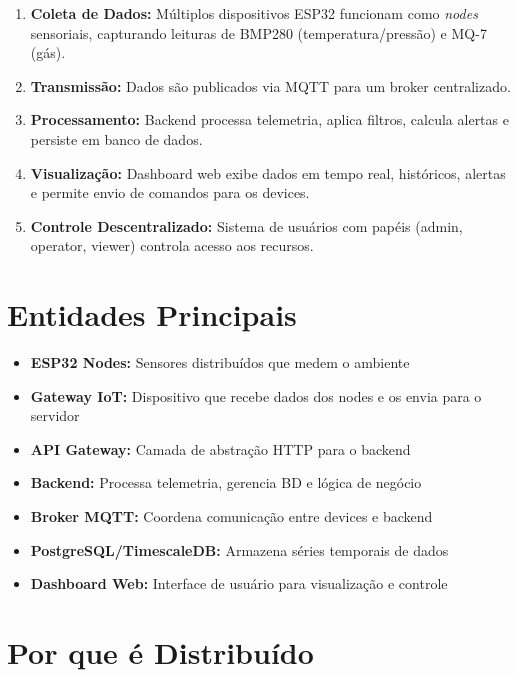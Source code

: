 \documentclass[12pt,a4paper,oneside]{report}
\begin{document}
\begin{enumerate}
    \item \textbf{Coleta de Dados:} Múltiplos dispositivos ESP32 funcionam como \textit{nodes} sensoriais, capturando leituras de BMP280 (temperatura/pressão) e MQ-7 (gás).
    
    \item \textbf{Transmissão:} Dados são publicados via MQTT para um broker centralizado.
    
    \item \textbf{Processamento:} Backend processa telemetria, aplica filtros, calcula alertas e persiste em banco de dados.
    
    \item \textbf{Visualização:} Dashboard web exibe dados em tempo real, históricos, alertas e permite envio de comandos para os devices.
    
    \item \textbf{Controle Descentralizado:} Sistema de usuários com papéis (admin, operator, viewer) controla acesso aos recursos.
\end{enumerate}

\section{Entidades Principais}

\begin{itemize}
    \item \textbf{ESP32 Nodes:} Sensores distribuídos que medem o ambiente
    \item \textbf{Gateway IoT:} Dispositivo que recebe dados dos nodes e os envia para o servidor
    \item \textbf{API Gateway:} Camada de abstração HTTP para o backend
    \item \textbf{Backend:} Processa telemetria, gerencia BD e lógica de negócio
    \item \textbf{Broker MQTT:} Coordena comunicação entre devices e backend
    \item \textbf{PostgreSQL/TimescaleDB:} Armazena séries temporais de dados
    \item \textbf{Dashboard Web:} Interface de usuário para visualização e controle
\end{itemize}

\section{Por que é Distribuído}
\end{document}
